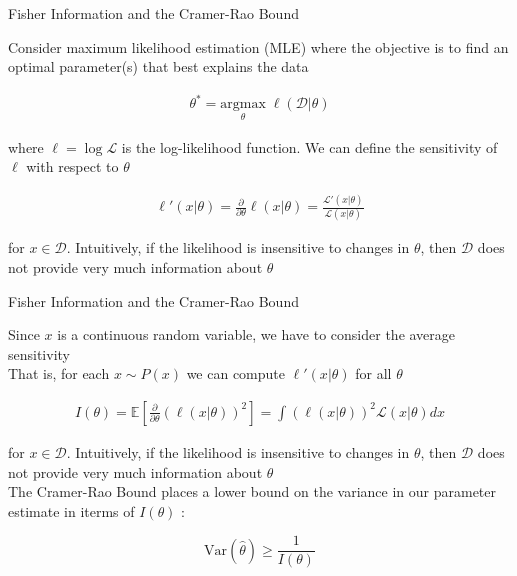 \documentclass[aspectratio=1610]{beamer}					%
\begin{document}
\begin{frame}{Fisher Information and the Cramer-Rao Bound}

Consider maximum likelihood estimation (MLE) where the objective is to find an optimal parameter(s) that best explains the data

\begin{align*}
\theta^{*} = \underset{\theta}{\mathrm{argmax}}\; \ell(\mathcal{D}|\theta)
\end{align*}

where $\ell = \log\mathcal{L}$ is the log-likelihood function. We can define the sensitivity of $\ell$ with respect to $\theta$

\begin{align*}
\ell'(x|\theta) = \frac{\partial}{\partial\theta} \ell(x|\theta) = \frac{\mathcal{L}'(x|\theta)}{\mathcal{L}(x|\theta)}
\end{align*}

for $x\in\mathcal{D}$. Intuitively, if the likelihood is insensitive to changes in $\theta$, then $\mathcal{D}$ does not provide very much information about $\theta$

\end{frame}

\begin{frame}{Fisher Information and the Cramer-Rao Bound}

Since $x$ is a continuous random variable, we have to consider the average sensitivity\\
\vspace{0.2in}
That is, for each $x\sim P(x)$ we can compute $\ell'(x|\theta)$ for all $\theta$

\begin{align*}
I(\theta) = \mathbb{E}\left[\frac{\partial}{\partial\theta} \left(\ell(x|\theta)\right)^{2}\right] = \int \left(\ell(x|\theta)\right)^{2} \mathcal{L}(x|\theta)dx
\end{align*}

for $x\in\mathcal{D}$. Intuitively, if the likelihood is insensitive to changes in $\theta$, then $\mathcal{D}$ does not provide very much information about $\theta$\\
\vspace{0.1in}
The Cramer-Rao Bound places a lower bound on the variance in our parameter estimate in iterms of $I(\theta)$ :

\begin{equation*}
\mathrm{Var}(\hat{\theta}) \geq \frac{1}{I(\theta)}
\end{equation*}

\end{frame}
\end{document}
